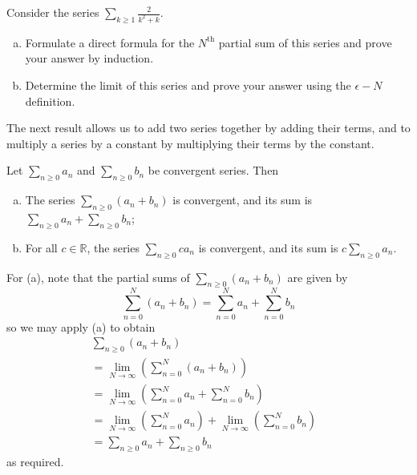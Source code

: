 \begin{exercise}
    
Consider the series $\displaystyle \sum_{k\geq1}^{} \frac{2}{k^2+k}$.
\begin{enumerate}[(a)]
    \item Formulate a direct formula for the $N^{\text{th}}$ partial sum of this series and prove your answer by induction.  
    \item Determine the limit of this series and prove your answer using the $\epsilon-N$ definition. 
\end{enumerate}
\end{exercise}

The next result allows us to add two series together by adding their terms, and to multiply a series by a constant by multiplying their terms by the constant.

\begin{theorem}
\label{thmLinearityOfSummation}
Let $\displaystyle \sum_{n \ge 0} a_n$ and $\displaystyle \sum_{n \ge 0} b_n$ be convergent series. Then
\begin{enumerate}[(a)]
\item The series $\displaystyle \sum_{n \ge 0} (a_n+b_n)$ is convergent, and its sum is $\displaystyle \sum_{n \ge 0} a_n + \sum_{n \ge 0} b_n$;
\item For all $c \in \mathbb{R}$, the series $\displaystyle \sum_{n \ge 0} c a_n$ is convergent, and its sum is $\displaystyle c \sum_{n \ge 0} a_n$.
\end{enumerate}
\end{theorem}

\begin{cproof}[of {(a)}]
For (a), note that the partial sums of $\displaystyle \sum_{n \ge 0} (a_n+b_n)$ are given by
\[ \sum_{n=0}^N (a_n + b_n) = \sum_{n=0}^N a_n + \sum_{n=0}^N b_n \]
so we may apply (a) to obtain
\begin{align*}
& \sum_{n \ge 0} (a_n + b_n) && \\
&= \lim_{N \to \infty} \left( \sum_{n=0}^N (a_n + b_n) \right) && \\
&= \lim_{N \to \infty} \left( \sum_{n=0}^N a_n + \sum_{n=0}^N b_n \right) \\
&= \lim_{N \to \infty} \left( \sum_{n=0}^N a_n \right) + \lim_{N \to \infty} \left( \sum_{n=0}^N b_n \right) && \\
&= \sum_{n \ge 0} a_n + \sum_{n \ge 0} b_n
\end{align*}
as required.
\end{cproof}

